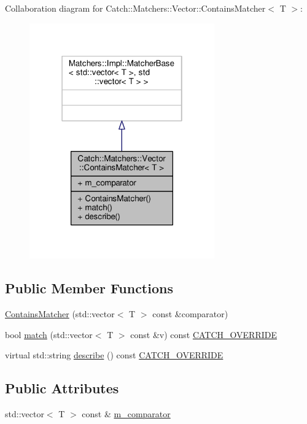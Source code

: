 Collaboration diagram for Catch\-:\-:Matchers\-:\-:Vector\-:\-:Contains\-Matcher$<$ T $>$\-:
\nopagebreak
\begin{figure}[H]
\begin{center}
\leavevmode
\includegraphics[width=226pt]{struct_catch_1_1_matchers_1_1_vector_1_1_contains_matcher__coll__graph}
\end{center}
\end{figure}
\subsection*{Public Member Functions}
\begin{DoxyCompactItemize}
\item 
\hyperlink{struct_catch_1_1_matchers_1_1_vector_1_1_contains_matcher_ad8e92c8399be6dce75bb5702cdfab700}{Contains\-Matcher} (std\-::vector$<$ T $>$ const \&comparator)
\item 
bool \hyperlink{struct_catch_1_1_matchers_1_1_vector_1_1_contains_matcher_aba81516816a6796124dd4fe4843e7284}{match} (std\-::vector$<$ T $>$ const \&v) const \hyperlink{catch_8hpp_a8ecdce4d3f57835f707915ae831eb847}{C\-A\-T\-C\-H\-\_\-\-O\-V\-E\-R\-R\-I\-D\-E}
\item 
virtual std\-::string \hyperlink{struct_catch_1_1_matchers_1_1_vector_1_1_contains_matcher_add1a31f049cec89f980424ecdb7027ac}{describe} () const \hyperlink{catch_8hpp_a8ecdce4d3f57835f707915ae831eb847}{C\-A\-T\-C\-H\-\_\-\-O\-V\-E\-R\-R\-I\-D\-E}
\end{DoxyCompactItemize}
\subsection*{Public Attributes}
\begin{DoxyCompactItemize}
\item 
std\-::vector$<$ T $>$ const \& \hyperlink{struct_catch_1_1_matchers_1_1_vector_1_1_contains_matcher_a83d051166e4ed0d535219ad6ee99abb2}{m\-\_\-comparator}
\end{DoxyCompactItemize}


